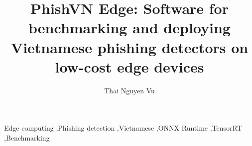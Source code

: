 \documentclass[final,5p,times,twocolumn]{elsarticle}
\begin{document}
\begin{frontmatter}
\title{PhishVN Edge: Software for benchmarking and deploying Vietnamese phishing detectors on low-cost edge devices}
\author[utc]{Thai Nguyen Vu}
\address[utc]{Campus in Ho Chi Minh City, University of Transport and Communications, Ho Chi Minh City, Vietnam}

\begin{keyword}
Edge computing \sep Phishing detection \sep Vietnamese \sep ONNX Runtime \sep TensorRT \sep Benchmarking
\end{keyword}
\end{frontmatter}










\end{document}
